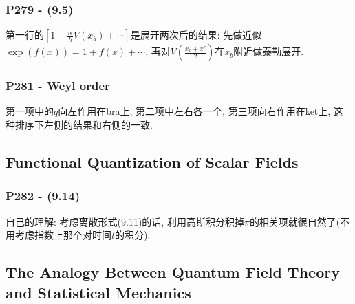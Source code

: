 \documentclass[cn,hazy,green,11pt,device=normal,chinesefont=founder]{elegantnote}
\begin{document}
\subsubsection{P279 - (9.5)}

第一行的$[1-\frac{i\epsilon}{\hbar}V(x_b)+\cdots]$是展开两次后的结果: 先做近似$\exp(f(x)) = 1 + f(x) + \cdots$, 再对$V(\frac{x_b + x'}{2})$在$x_b$附近做泰勒展开.  

\subsubsection{P281 - Weyl order}

第一项中的$q$向左作用在bra上, 第二项中左右各一个, 第三项向右作用在ket上, 这种排序下左侧的结果和右侧的一致. 

\subsection{Functional Quantization of Scalar Fields}

\subsubsection{P282 - (9.14)}

\begin{remark}
  自己的理解: 考虑离散形式(9.11)的话, 利用高斯积分积掉$\pi$的相关项就很自然了(不用考虑指数上那个对时间$t$的积分). 
\end{remark}

\subsection{The Analogy Between Quantum Field Theory and Statistical Mechanics}


\clearpage




\end{document}
